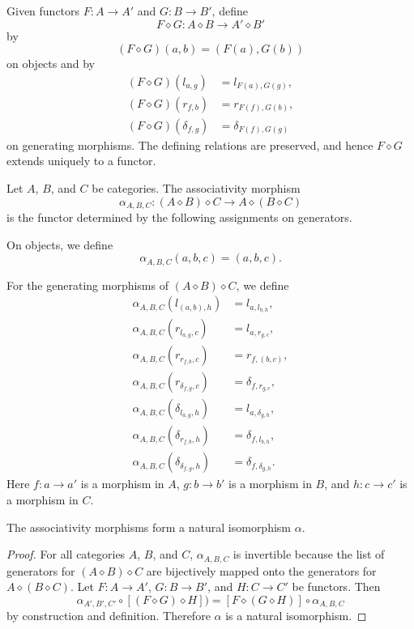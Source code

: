 \documentclass{tac}
\begin{document}
Given functors $F:A\to A'$ and $G:B\to B'$, define
\[
F\diamond G:A\diamond B\longrightarrow A'\diamond B'
\]
by
\[
(F\diamond G)(a,b)=(F(a),G(b))
\]
on objects and by
\begin{align*}
(F\diamond G)(l_{a,g})
&=l_{F(a),G(g)},\\
(F\diamond G)(r_{f,b})
&=r_{F(f),G(b)},\\
(F\diamond G)(\delta_{f,g})
&=\delta_{F(f),G(g)}
\end{align*}
on generating morphisms. The defining relations are preserved, and hence
$F\diamond G$ extends uniquely to a functor.

\begin{definition}
Let $A$, $B$, and $C$ be categories. The associativity morphism
\[
\alpha_{A,B,C}:(A\diamond B)\diamond C
\longrightarrow
A\diamond(B\diamond C)
\]
is the functor determined by the following assignments on generators.

On objects, we define
\[
\alpha_{A,B,C}(a,b,c)=(a,b,c).
\]

For the generating morphisms of $(A\diamond B)\diamond C$, we define
\begin{align*}
\alpha_{A,B,C}(l_{(a,b),h})
&=l_{a,l_{b,h}},\\
\alpha_{A,B,C}(r_{l_{a,g},c})
&=l_{a,r_{g,c}},\\
\alpha_{A,B,C}(r_{r_{f,b},c})
&=r_{f,(b,c)},\\
\alpha_{A,B,C}(r_{\delta_{f,g},c})
&=\delta_{f,r_{g,c}},\\
\alpha_{A,B,C}(\delta_{l_{a,g},h})
&=l_{a,\delta_{g,h}},\\
\alpha_{A,B,C}(\delta_{r_{f,b},h})
&=\delta_{f,l_{b,h}},\\
\alpha_{A,B,C}(\delta_{\delta_{f,g},h})
&=\delta_{f,\delta_{g,h}}.
\end{align*}
Here $f:a\to a'$ is a morphism in $A$, $g:b\to b'$ is a morphism in
$B$, and $h:c\to c'$ is a morphism in $C$.
\end{definition}

\begin{lemma}\label{lemma_ass_forms_nat_iso}
The associativity morphisms form a natural isomorphism $\alpha$.
\end{lemma}

\begin{proof}
For all categories $A$, $B$, and $C$, $\alpha_{A,B,C}$ is invertible because the list of generators for $(A\diamond B)\diamond C$ are bijectively mapped onto the generators for $A\diamond(B\diamond C)$. Let $F:A\to A'$, $G:B\to B'$, and $H:C\to C'$ be functors. Then 
\[
\alpha_{A',B',C'}\circ[ (F\diamond G)\diamond H])=[F\diamond(G\diamond H)]\circ\alpha_{A,B,C}
\]
by construction and definition. Therefore $\alpha$ is a natural isomorphism.
\end{proof}
\end{document}
